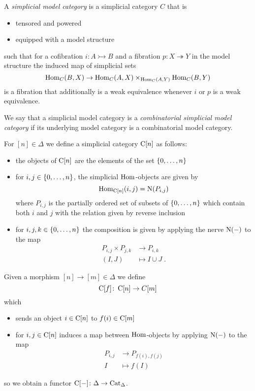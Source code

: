 \begin{definition}
    A \emph{simplicial model category} is a simplicial category $C$ that is 
    \begin{itemize}
        \item tensored and powered
        \item equipped with a model structure
    \end{itemize} 
    such that for a cofibration $i:A\rightarrowtail B$ and a fibration $p:X\twoheadrightarrow Y$ in the model structure the induced map of simplicial sets
    \begin{equation*}
        \operatorname{Hom}_C(B,X)\to\operatorname{Hom}_C(A,X)\times_{\operatorname{Hom}_C(A,Y)}\operatorname{Hom}_C(B,Y)
    \end{equation*}
    is a fibration that additionally is a weak equivalence whenever $i$ or $p$ is a weak equivalence.
    
    We say that a simplicial model category is a \emph{combinatorial simplicial model category} if its underlying model category is a combinatorial model category.
\end{definition}
\begin{construction}
    For $[n]\in\Delta$ we define a simplicial category $\operatorname{C}[n]$ as follows:
    \begin{itemize}
        \item the objects of $\operatorname{C}[n]$ are the elements of the set $\left\lbrace0,\ldots,n\right\rbrace$
        \item for $i,j\in\left\lbrace0,\ldots,n\right\rbrace$, the simplicial $\operatorname{Hom}$-objects are given by 
            \begin{equation*}
                \operatorname{Hom}_{\operatorname{C}[n]}(i,j)=\operatorname{N}(P_{i,j})
            \end{equation*}
            where $P_{i,j}$ is the partially ordered set of subsets of $\left\lbrace0,\ldots,n\right\rbrace$ which contain both $i$ and $j$ with the relation given by reverse inclusion
        \item for $i,j,k\in\left\lbrace0,\ldots,n\right\rbrace$ the composition is given by applying the nerve $\operatorname{N}(-)$ to the map
        \begin{align*}
                P_{i,j}\times P_{j,k}&\to P_{i,k}\\
                (I,J)&\mapsto I\cup J\;.
        \end{align*}
    \end{itemize}
    Given a morphism $[n]\to[m]\in\Delta$ we define
    \begin{equation*}
        \operatorname{C}[f]\colon\operatorname{C}[n]\to C[m]
    \end{equation*}
    which
    \begin{itemize}
        \item sends an object $i\in\operatorname{C}[n]$ to $f(i)\in\operatorname{C}[m]$
        \item for $i,j\in\operatorname{C}[n]$ induces a map between $\operatorname{Hom}$-objects by applying $\operatorname{N}(-)$ to the map
            \begin{align*}
                P_{i,j}&\to P_{f(i),f(j)}\\
                I&\mapsto f(I)
            \end{align*}
    \end{itemize}
    so we obtain a functor $\operatorname{C}[-]\colon\Delta\to\operatorname{Cat}_{\Delta}$.
\end{construction}
